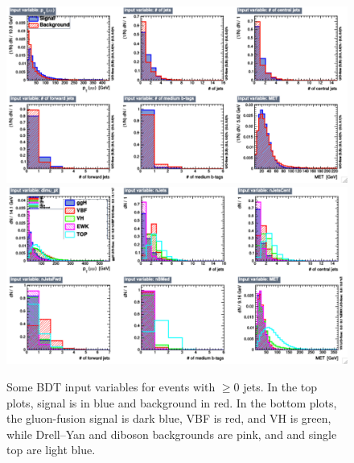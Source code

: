 \begin{figure}
  \includegraphics[width=1.0\linewidth]{figures/bdt_training/BDT_in_ge0j_all.pdf}
  \includegraphics[width=1.0\linewidth]{figures/bdt_training/BDT_in_ge0j_sep.pdf}
  \caption{Some BDT input variables for events with $\ge 0$ jets.
           In the top plots, signal is in blue and background in red.
           In the bottom plots, the gluon-fusion signal is dark blue, VBF is red, and VH is green,
           while Drell--Yan and diboson backgrounds are pink, and \ttbar and single top are light blue.}
  \label{fig:BDT_in_ge0j}
\end{figure}

